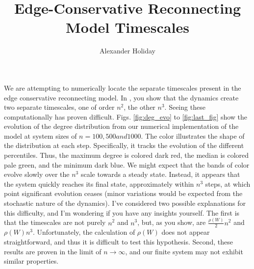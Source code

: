 \documentclass[11pt]{article}
\begin{document}
\title{\vspace{-5mm}Edge-Conservative Reconnecting Model Timescales}
\author{Alexander Holiday}
\maketitle

We are attempting to numerically locate the separate timescales present in the edge conservative reconnecting model. In \cite{Rath2012}, you show that the dynamics create two separate timescales, one of order $n^{2}$, the other $n^{3}$. Seeing these computationally has proven difficult. Figs. \ref{fig:deg_evo} to \ref{fig:last_fig} show the evolution of the degree distribution from our numerical implementation of the model at system sizes of $n=100, 500 and 1000$. The color illustrates the shape of the distribution at each step. Specifically, it tracks the evolution of the different percentiles. Thus, the maximum degree is colored dark red, the median is colored pale green, and the minimum dark blue. We might expect that the bands of color evolve slowly over the $n^{3}$ scale towards a steady state. Instead, it appears that the system quickly reaches its final state, approximately within $n^{3}$ steps, at which point significant evolution ceases (minor variations would be expected from the stochastic nature of the dynamics). I've considered two possible explanations for this difficulty, and I'm wondering if you have any insights yourself. The first is that the timescales are not purely $n^{2}$ and $n^{3}$, but, as you show, are $\frac{\rho(W)}{2} n^{2}$ and $\rho(W) n^{3}$. Unfortunately, the calculation of $\rho(W)$ does not appear straightforward, and thus it is difficult to test this hypothesis. Second, these results are proven in the limit of $n \rightarrow \infty$, and our finite system may not exhibit similar properties.
\end{document}
